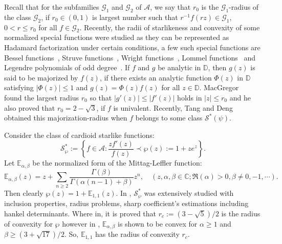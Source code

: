 \documentclass[12pt, reqno]{amsart}
\numberwithin{equation}{section}
\theoremstyle{plain}
\theoremstyle{definition}
\theoremstyle{remark}
\begin{document}
Recall that for the subfamilies $\mathcal{G}_1$ and $\mathcal{G}_2$ of $\mathcal{A}$, we say that $r_0$ is the $\mathcal{G}_1$-radius of the class $\mathcal{G}_2$, if $r_0\in(0,1)$ is largest number such that $r^{-1}f(rz)\in \mathcal{G}_1$, $0<r\leq r_0$ for all $f\in \mathcal{G}_2$. Recently, the radii of starlikeness and convexity of some normalized special functions were studied as they can be represented as Hadamard factorization under certain conditions, a few such special functions are Bessel functions~\cite{abo-2018}, Struve functions~\cite{bdoy-2016,abo-2018}, Wright functions~\cite{btk-2-18}, Lommel functions~\cite{bdoy-2016,abo-2018} and  Legendre polynomials of odd degree~\cite{bulut-engel-2019}. If $f$ and $g$ be analytic in $\mathbb{D}$, then $g(z)$ is said to be majorized by $f(z)$, if there exists an analytic function $\Phi(z)$ in $\mathbb{D}$ satisfying $|\Phi(z)|\leq1$ and $g(z)=\Phi(z) f(z)$ for all $z\in\mathbb{D}.$ MacGregor~\cite{mc} found the largest radius $r_0$ so that $|g'(z)|\leq|f'(z)|$ holds in $|z|\leq r_0$ and he also proved that $r_0=2-\sqrt{3}$, if $f$ is univalent. Recently, Tang and Deng~\cite{tang} obtained this majorization-radius when $f$ belongs to some class $\mathcal{S}^{*}(\psi)$.


Consider the class of cardioid starlike functions:
\begin{equation}\label{class}
\mathcal{S}^*_{\wp}:=\left\{f\in\mathcal{A}: \frac{zf'(z)}{f(z)}\prec\wp(z):=1+ze^z\right\}.
\end{equation}
Let $\mathbb{E}_{\alpha, \beta}$ be the normalized form of the Mittag-Leffler function:
\begin{equation*}
\mathbb{E}_{\alpha, \beta}(z)=z+\sum_{n\geq2}\frac{\Gamma(\beta)}{\Gamma(\alpha(n-1)+\beta)}z^n, \quad (z, \alpha, \beta\in\mathbb{C}; \Re(\alpha) > 0, \beta\neq 0,-1,\cdots).
\end{equation*}
Then clearly $\wp(z)=1+\mathbb{E}_{1,1}(z)$.
In \cite{Kumar-cardioid}, $\mathcal{S}^*_{\wp}$ was extensively studied with inclusion properties, radius problems, sharp coefficient's estimations including hankel determinants. Where in, it is proved that $r_c:=(3-\sqrt{5})/2$ is the radius of convexity for $\wp$ however in \cite{BP-mitiig-2016}, $\mathbb{E}_{\alpha, \beta}$ is shown to be convex for $\alpha\geq 1$ and $\beta\geq (3 +\sqrt{17})/2$. So, $\mathbb{E}_{1,1}$ has the radius of convexity $r_c$.
\end{document}
